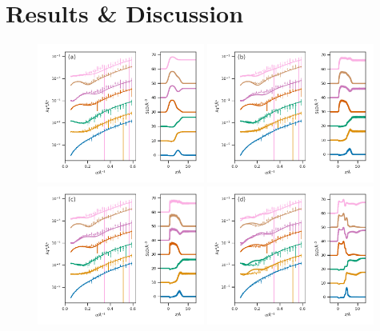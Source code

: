 \documentclass[amsmath,amssymb,twocolumn,superscriptaddress,aps,prl]{revtex4-1}
\begin{document}
\section{Results \& Discussion}
%
\begin{figure}
 \centering
 \includegraphics[width=0.49\textwidth]{figures/trad_30}
 \includegraphics[width=0.49\textwidth]{figures/sim_slipids_30} \\
 \includegraphics[width=0.49\textwidth]{figures/sim_berger_30}
 \includegraphics[width=0.49\textwidth]{figures/sim_martini_30}

\end{figure}
\end{document}
